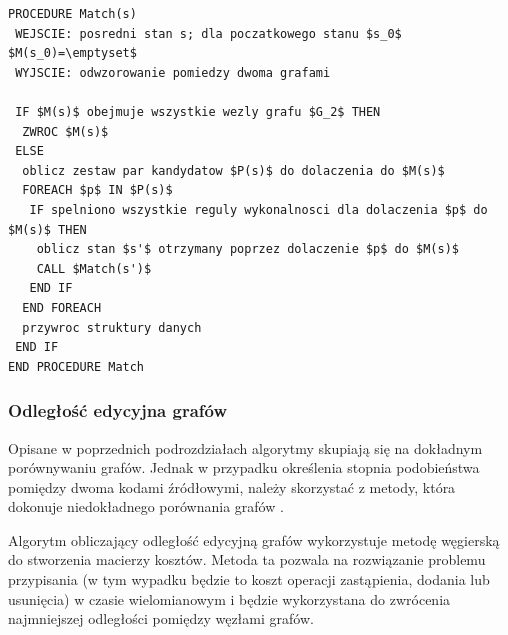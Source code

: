\documentclass[a4paper,12pt]{article}
\begin{document}
\begin{lstlisting}[mathescape, caption={Pseudokod algorytmu VF2.}, label={lst:vf2}]
PROCEDURE Match(s)
 WEJSCIE: posredni stan s; dla poczatkowego stanu $s_0$ $M(s_0)=\emptyset$
 WYJSCIE: odwzorowanie pomiedzy dwoma grafami
 
 IF $M(s)$ obejmuje wszystkie wezly grafu $G_2$ THEN
  ZWROC $M(s)$
 ELSE
  oblicz zestaw par kandydatow $P(s)$ do dolaczenia do $M(s)$
  FOREACH $p$ IN $P(s)$
   IF spelniono wszystkie reguly wykonalnosci dla dolaczenia $p$ do $M(s)$ THEN
    oblicz stan $s'$ otrzymany poprzez dolaczenie $p$ do $M(s)$
    CALL $Match(s')$
   END IF
  END FOREACH
  przywroc struktury danych
 END IF
END PROCEDURE Match
\end{lstlisting}

\newpage

\subsubsection{Odległość edycyjna grafów}

Opisane w poprzednich podrozdziałach algorytmy skupiają się na dokładnym porównywaniu grafów. Jednak w przypadku określenia stopnia podobieństwa pomiędzy dwoma kodami źródłowymi, należy skorzystać z metody, która dokonuje niedokładnego porównania grafów \cite{inexact}\cite{inexact2}.

Algorytm obliczający odległość edycyjną grafów wykorzystuje metodę węgierską \cite{hun} do stworzenia macierzy kosztów. Metoda ta pozwala na rozwiązanie problemu przypisania (w tym wypadku będzie to koszt operacji zastąpienia, dodania lub usunięcia) w czasie wielomianowym i będzie wykorzystana do zwrócenia najmniejszej odległości pomiędzy węzłami grafów. 
\end{document}
